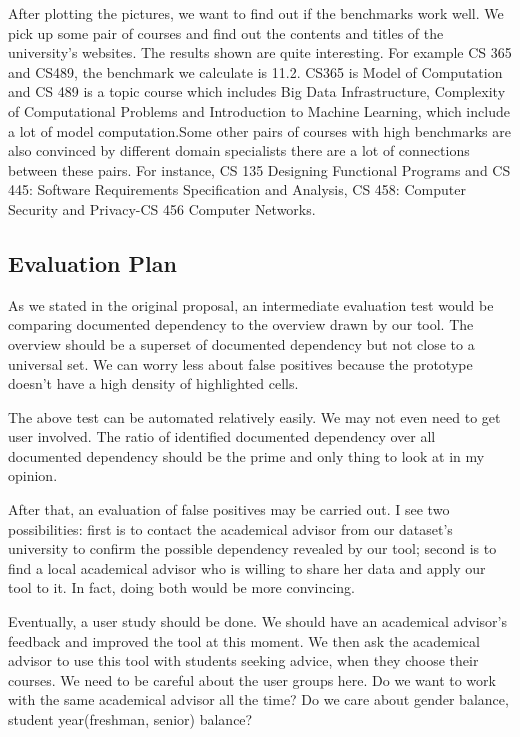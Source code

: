 After plotting the pictures, we want to find out if the benchmarks work well. We pick up some pair of courses and find out the contents and titles of the university’s websites. The results shown are quite interesting. For example CS 365 and CS489, the benchmark we calculate is 11.2. CS365 is  Model of Computation and CS 489 is a topic course which includes Big Data Infrastructure, Complexity of Computational Problems and Introduction to Machine Learning, which include a lot of model computation.Some other pairs of courses with high benchmarks are also convinced by different domain specialists there are a lot of connections between these pairs. For instance, CS 135 Designing Functional Programs and CS 445: Software Requirements Specification and Analysis, CS 458: Computer Security and Privacy-CS 456 Computer Networks.


\subsection{Evaluation Plan}
\label{sec:plan}

As we stated in the original proposal, an intermediate evaluation test would be comparing documented dependency to the overview drawn by our tool. The overview should be a superset of documented dependency but not close to a universal set. We can worry less about false positives because the prototype doesn't have a high density of highlighted cells.

The above test can be automated relatively easily. We may not even need to get user involved. The ratio of identified documented dependency over all documented dependency should be the prime and only thing to look at in my opinion.

After that, an evaluation of false positives may be carried out. I see two possibilities: first is to contact the academical advisor from our dataset's university to confirm the possible dependency revealed by our tool; second is to find a local academical advisor who is willing to share her data and apply our tool to it. In fact, doing both would be more convincing.

Eventually, a user study should be done. We should have an academical advisor's feedback and improved the tool at this moment. We then ask the academical advisor to use this tool with students seeking advice, when they choose their courses. We need to be careful about the user groups here. Do we want to work with the same academical advisor all the time? Do we care about gender balance, student year(freshman, senior) balance?

